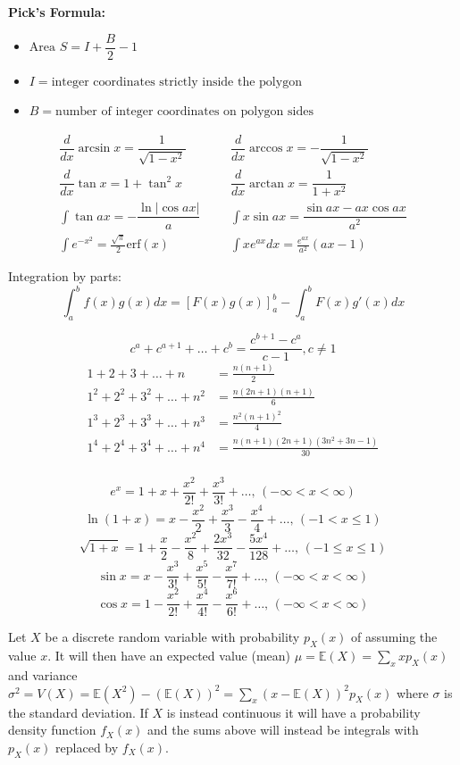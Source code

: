 \vspace{1pt}
\noindent
\textbf{Pick's Formula:}
\begin{itemize}[leftmargin=*, nosep]
    \item $\text{Area } S = I + \dfrac{B}{2} - 1$
    \item $I = \text{integer coordinates strictly inside the polygon}$
    \item $B = \text{number of integer coordinates on polygon sides}$
\end{itemize}


\begin{align*}
	\dfrac{d}{dx}\arcsin x = \dfrac{1}{\sqrt{1-x^2}} &&& \dfrac{d}{dx}\arccos x = -\dfrac{1}{\sqrt{1-x^2}} \\
	\dfrac{d}{dx}\tan x = 1+\tan^2 x &&& \dfrac{d}{dx}\arctan x = \dfrac{1}{1+x^2} \\
	\int\tan ax = -\dfrac{\ln|\cos ax|}{a} &&& \int x\sin ax = \dfrac{\sin ax-ax \cos ax}{a^2} \\
	\int e^{-x^2} = \frac{\sqrt \pi}{2} \text{erf}(x) &&& \int xe^{ax}dx = \frac{e^{ax}}{a^2}(ax-1)
\end{align*}

Integration by parts:
\[\int_a^bf(x)g(x)dx = [F(x)g(x)]_a^b-\int_a^bF(x)g'(x)dx\]

\[ c^a + c^{a+1} + \dots + c^{b} = \frac{c^{b+1} - c^a}{c-1}, c \neq 1 \]
\begin{align*}
	1 + 2 + 3 + \dots + n &= \frac{n(n+1)}{2} \\
	1^2 + 2^2 + 3^2 + \dots + n^2 &= \frac{n(2n+1)(n+1)}{6} \\
	1^3 + 2^3 + 3^3 + \dots + n^3 &= \frac{n^2(n+1)^2}{4} \\
	1^4 + 2^4 + 3^4 + \dots + n^4 &= \frac{n(n+1)(2n+1)(3n^2 + 3n - 1)}{30} \\
\end{align*}

$$e^x = 1+x+\frac{x^2}{2!}+\frac{x^3}{3!}+\dots,\,(-\infty<x<\infty)$$
$$\ln(1+x) = x-\frac{x^2}{2}+\frac{x^3}{3}-\frac{x^4}{4}+\dots,\,(-1<x\leq1)$$
$$\sqrt{1+x} = 1+\frac{x}{2}-\frac{x^2}{8}+\frac{2x^3}{32}-\frac{5x^4}{128}+\dots,\,(-1\leq x\leq1)$$
$$\sin x = x-\frac{x^3}{3!}+\frac{x^5}{5!}-\frac{x^7}{7!}+\dots,\,(-\infty<x<\infty)$$
$$\cos x = 1-\frac{x^2}{2!}+\frac{x^4}{4!}-\frac{x^6}{6!}+\dots,\,(-\infty<x<\infty)$$

Let $X$ be a discrete random variable with probability $p_X(x)$ of assuming the value $x$. It will then have an expected value (mean) $\mu=\mathbb{E}(X)=\sum_xxp_X(x)$ and variance $\sigma^2=V(X)=\mathbb{E}(X^2)-(\mathbb{E}(X))^2=\sum_x(x-\mathbb{E}(X))^2p_X(x)$ where $\sigma$ is the standard deviation. If $X$ is instead continuous it will have a probability density function $f_X(x)$ and the sums above will instead be integrals with $p_X(x)$ replaced by $f_X(x)$.

